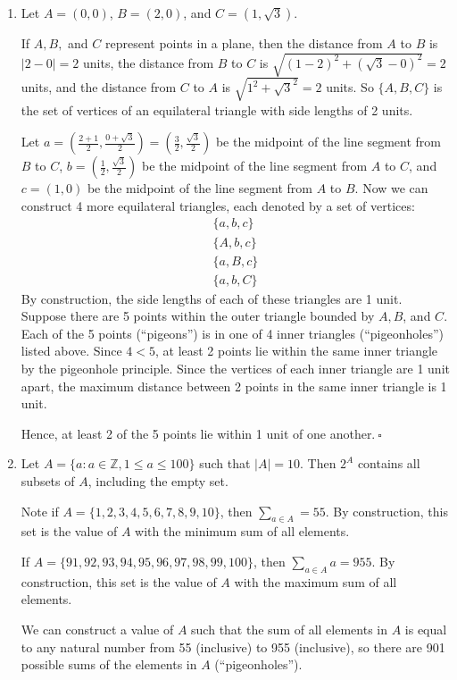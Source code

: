 \documentclass{article}
\newcommand{\Z}{\mathbb{Z}}
\theoremstyle{definition}
\begin{document}
\begin{solution}
\begin{enumerate}
\item Let $A=(0,0)$, $B=(2,0)$, and $C=(1,\sqrt{3})$.

\noindent If $A,B,$ and $C$ represent points in a plane, then the distance from $A$ to $B$ is $|2-0|=2$ units, the distance from $B$ to $C$ is $\sqrt{(1-2)^2+(\sqrt{3}-0)^2}=2$ units, and the distance from $C$ to $A$ is $\sqrt{1^2+\sqrt{3}^2}=2$ units. So $\{A,B,C\}$ is the set of vertices of an equilateral triangle with side lengths of 2 units.

\noindent Let $a=\left(\frac{2+1}{2},\frac{0+\sqrt{3}}{2}\right)=\left(\frac{3}{2},\frac{\sqrt{3}}{2}\right)$ be the midpoint of the line segment from $B$ to $C$, $b=\left(\frac{1}{2},\frac{\sqrt{3}}{2}\right)$ be the midpoint of the line segment from $A$ to $C$, and $c=\left(1,0\right)$ be the midpoint of the line segment from $A$ to $B$. Now we can construct 4 more equilateral triangles, each denoted by a set of vertices:
\begin{align}
\{a,b,c\}\\
\{A,b,c\}\\
\{a,B,c\}\\
\{a,b,C\}
\end{align}
By construction, the side lengths of each of these triangles are 1 unit. Suppose there are 5 points within the outer triangle bounded by $A,B$, and $C$. Each of the 5 points (``pigeons'') is in one of 4 inner triangles (``pigeonholes'') listed above. Since $4<5$, at least 2 points lie within the same inner triangle by the pigeonhole principle. Since the vertices of each inner triangle are 1 unit apart, the maximum distance between 2 points in the same inner triangle is 1 unit.

\noindent Hence, at least 2 of the 5 points lie within 1 unit of one another.$~\square$
\item Let $A=\{a:a\in\Z,1\leq a\leq 100\}$ such that $|A|=10$. Then $2^A$ contains all subsets of $A$, including the empty set.

Note if $A=\{1,2,3,4,5,6,7,8,9,10\}$, then $\sum_{a\in A}=55$. By construction, this set is the value of $A$ with the minimum sum of all elements.

If $A=\{91,92,93,94,95,96,97,98,99,100\}$, then $\sum_{a\in A}{a}=955$. By construction, this set is the value of $A$ with the maximum sum of all elements.

We can construct a value of $A$ such that the sum of all elements in $A$ is equal to any natural number from 55 (inclusive) to 955 (inclusive), so there are 901 possible sums of the elements in $A$ (``pigeonholes'').


\end{enumerate}
\end{solution}
\end{document}
